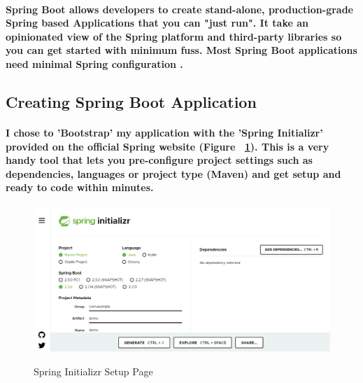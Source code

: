 \paragraph{Spring Boot allows developers to create stand-alone, production-grade Spring based Applications that you can "just run".
It take an opinionated view of the Spring platform and third-party libraries so you can get started with minimum fuss. Most Spring Boot applications need minimal Spring configuration \cite{Spring:SpringBoot}.}
\subsection{Creating Spring Boot Application}
\paragraph{I chose to 'Bootstrap' my application with the 'Spring Initializr' provided on the official Spring website (Figure ~\ref{spring1_label}). This is a very handy tool that lets you pre-configure project settings such as dependencies, languages or project type (Maven) and get setup and ready to code within minutes.}
\begin{figure}[ht]
    \centering
    \includegraphics[scale=0.35]{Images/spring1.png} 
    \label{spring1_label}
    \caption{Spring Initializr Setup Page}
\end{figure}
